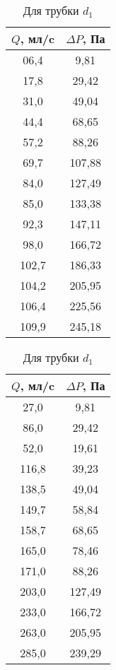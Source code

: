 \documentclass[a4paper,12pt]{article} %
\begin{document}
\begin{table}[!htb]
  \begin{minipage}{.5\linewidth}
    \caption{Для трубки $d_1$}
    \centering
      \begin{tabular}{|c|c|}
      \hline
      $Q$, мл/c & $\Delta P$, Па \\ \hline
      06,4 &   9,81 \\ \hline
      17,8 &  29,42 \\ \hline
      31,0 &  49,04 \\ \hline
      44,4 &  68,65 \\ \hline
      57,2 &  88,26 \\ \hline
      69,7 & 107,88 \\ \hline
      84,0 & 127,49 \\ \hline
      85,0 & 133,38 \\ \hline
      92,3 & 147,11 \\ \hline
      98,0 & 166,72 \\ \hline
      102,7 & 186,33 \\ \hline
      104,2 & 205,95 \\ \hline
      106,4 & 225,56 \\ \hline
      109,9 & 245,18 \\ \hline
      \end{tabular}
  \end{minipage}
  \begin{minipage}{.5\linewidth}
    \centering
      \begin{tabular}{|c|c|}
      \hline
      $Q$, мл/c &  $\Delta P$, Па \\ \hline
        27,0 &          9,81 \\ \hline
        86,0 &         29,42 \\ \hline
        52,0 &         19,61 \\ \hline
        116,8 &         39,23 \\ \hline
        138,5 &         49,04 \\ \hline
        149,7 &         58,84 \\ \hline
        158,7 &         68,65 \\ \hline
        165,0 &         78,46 \\ \hline
        171,0 &         88,26 \\ \hline
        203,0 &        127,49 \\ \hline
        233,0 &        166,72 \\ \hline
        263,0 &        205,95 \\ \hline
        285,0 &        239,29 \\ \hline
      \end{tabular}
  \end{minipage} 
\end{table}
\end{document}
